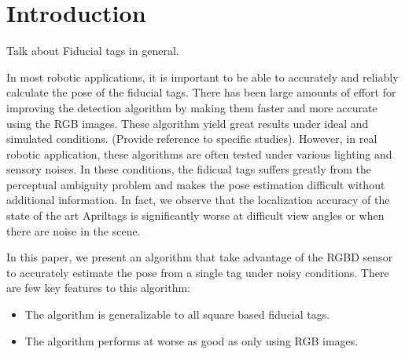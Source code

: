 \section{Introduction}
\label{sec:intro}
Talk about Fiducial tags in general.

In most robotic applications, it is important to be able to accurately and reliably calculate the pose of the fiducial tags. There has been large amounts of effort for improving the detection algorithm by making them faster and more accurate using the RGB images. These algorithm yield great results under ideal and simulated conditions. (Provide reference to specific studies). However, in real robotic application, these algorithms are often tested under various lighting and sensory noises. In these conditions, the fidicual tags suffers greatly from the perceptual ambiguity problem and makes the pose estimation difficult without additional information. In fact, we observe that the localization accuracy of the state of the art Apriltags is significantly worse at difficult view angles or when there are noise in the scene. 

In this paper, we present an algorithm that take advantage of the RGBD sensor to accurately estimate the pose from a single tag under noisy conditions. There are few key features to this algorithm: 
\begin{itemize}
\item The algorithm is generalizable to all square based fiducial tags.
\item The algorithm performs at worse as good as only using RGB images.
\end{itemize}